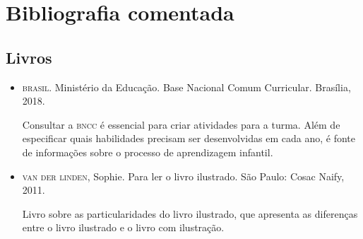 \documentclass[11pt]{extarticle}
\begin{document}
\section{Bibliografia comentada}

\subsection{Livros}

\begin{itemize}
\item \textsc{brasil}. Ministério da Educação. Base Nacional Comum Curricular. Brasília, 2018.

Consultar a \textsc{bncc} é essencial para criar atividades para a turma. Além de especificar 
quais habilidades precisam ser desenvolvidas em cada ano, é fonte de informações sobre 
o processo de aprendizagem infantil. 

 
\item \textsc{van der linden}, Sophie. Para ler o livro ilustrado. São Paulo: Cosac Naify, 2011.

Livro sobre as particularidades do livro ilustrado, que apresenta as diferenças entre o livro ilustrado e o livro com ilustração. 
\end{itemize}
\end{document}
